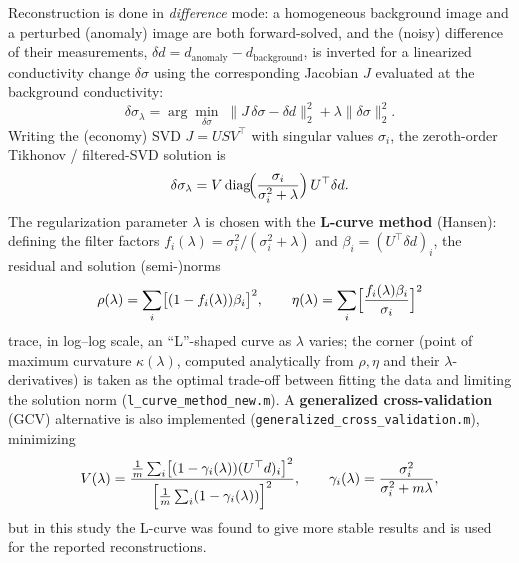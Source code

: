 \documentclass[11pt]{article}
\begin{document}
Reconstruction is done in \emph{difference} mode: a homogeneous background image and a perturbed (anomaly) image are both forward-solved, and the (noisy) difference of their measurements, $\delta d = d_\text{anomaly}-d_\text{background}$, is inverted for a linearized conductivity change $\delta\sigma$ using the corresponding Jacobian $J$ evaluated at the background conductivity:
\begin{equation}
\delta\sigma_\lambda = \arg\min_{\delta\sigma}\; \|J\,\delta\sigma - \delta d\|_2^2 + \lambda \|\delta\sigma\|_2^2 .
\end{equation}
Writing the (economy) SVD $J = U S V^\top$ with singular values $\sigma_i$, the zeroth-order Tikhonov / filtered-SVD solution is
\begin{equation}
\delta\sigma_\lambda = V\,\mathrm{diag}\!\Bigl(\frac{\sigma_i}{\sigma_i^2+\lambda}\Bigr)\,U^\top \delta d. \label{eq:tsvd}
\end{equation}
The regularization parameter $\lambda$ is chosen with the \textbf{L-curve method} (Hansen): defining the filter factors $f_i(\lambda)=\sigma_i^2/(\sigma_i^2+\lambda)$ and $\beta_i = (U^\top\delta d)_i$, the residual and solution (semi-)norms
\begin{equation}
\rho(\lambda)=\sum_i\bigl[(1-f_i(\lambda))\beta_i\bigr]^2, \qquad
\eta(\lambda)=\sum_i\Bigl[\frac{f_i(\lambda)\beta_i}{\sigma_i}\Bigr]^2
\end{equation}
trace, in log--log scale, an ``L''-shaped curve as $\lambda$ varies; the corner (point of maximum curvature $\kappa(\lambda)$, computed analytically from $\rho,\eta$ and their $\lambda$-derivatives) is taken as the optimal trade-off between fitting the data and limiting the solution norm (\texttt{l\_curve\_method\_new.m}). A \textbf{generalized cross-validation} (GCV) alternative is also implemented (\texttt{generalized\_cross\_validation.m}), minimizing
\begin{equation}
V(\lambda) = \frac{\frac{1}{m}\sum_i\bigl[(1-\gamma_i(\lambda))(U^\top d)_i\bigr]^2}{\Bigl[\frac{1}{m}\sum_i(1-\gamma_i(\lambda))\Bigr]^2}, \qquad \gamma_i(\lambda)=\frac{\sigma_i^2}{\sigma_i^2+m\lambda},
\end{equation}
but in this study the L-curve was found to give more stable results and is used for the reported reconstructions.
\end{document}
